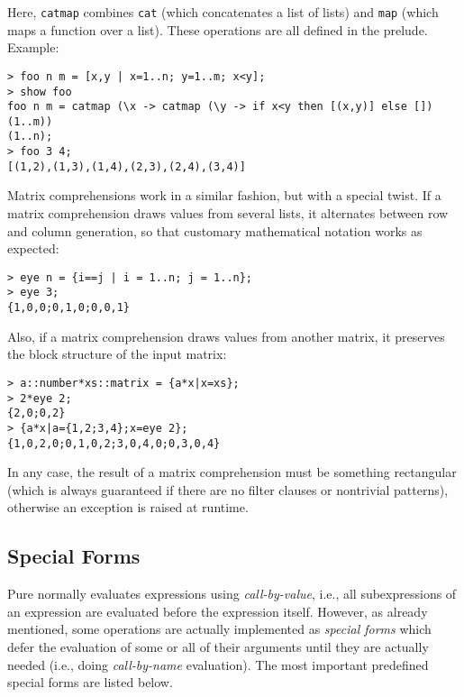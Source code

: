 \documentclass[a4paper,12pt]{article}
\begin{document}
Here, \verb|catmap| combines \verb|cat| (which concatenates a list of lists) and \verb|map| (which maps a function over a list). These operations are all defined in the prelude. Example:

\begin{lstlisting}
> foo n m = [x,y | x=1..n; y=1..m; x<y];
> show foo
foo n m = catmap (\x -> catmap (\y -> if x<y then [(x,y)] else []) (1..m))
(1..n);
> foo 3 4;
[(1,2),(1,3),(1,4),(2,3),(2,4),(3,4)]
\end{lstlisting}

Matrix comprehensions work in a similar fashion, but with a special twist. If a matrix comprehension draws values from several lists, it alternates between row and column generation, so that customary mathematical notation works as expected:

\begin{lstlisting}
> eye n = {i==j | i = 1..n; j = 1..n};
> eye 3;
{1,0,0;0,1,0;0,0,1}
\end{lstlisting}

Also, if a matrix comprehension draws values from another matrix, it preserves the block structure of the input matrix:

\begin{lstlisting}
> a::number*xs::matrix = {a*x|x=xs};
> 2*eye 2;
{2,0;0,2}
> {a*x|a={1,2;3,4};x=eye 2};
{1,0,2,0;0,1,0,2;3,0,4,0;0,3,0,4}
\end{lstlisting}

In any case, the result of a matrix comprehension must be something rectangular (which is always guaranteed if there are no filter clauses or nontrivial patterns), otherwise an exception is raised at runtime.

\subsection{Special Forms}
\label{Special}

Pure normally evaluates expressions using \emph{call-by-value}, i.e., all subexpressions of an expression are evaluated before the expression itself. However, as already mentioned, some operations are actually implemented as \emph{special forms} which defer the evaluation of some or all of their arguments until they are actually needed (i.e., doing \emph{call-by-name} evaluation). The most important predefined special forms are listed below.
\end{document}
